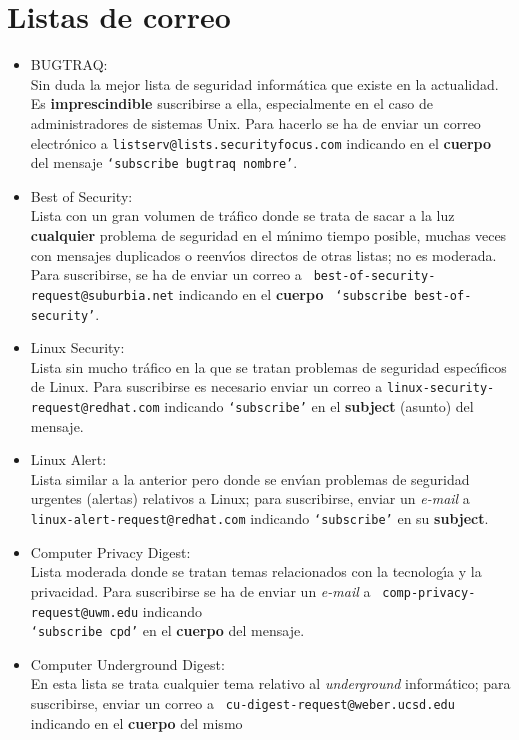 \section{Listas de correo}
\begin{itemize}
\item BUGTRAQ:\\
Sin duda la mejor lista de seguridad inform\'atica que existe en la actualidad.
Es {\bf imprescindible} suscribirse a ella, especialmente en el caso de 
administradores de sistemas Unix. Para hacerlo se ha de enviar un correo 
electr\'onico a {\tt listserv@lists.securityfocus.com} indicando en el {\bf 
cuerpo} del mensaje {\tt `subscribe bugtraq nombre'}.
\item Best of Security:\\
Lista con un gran volumen de tr\'afico donde se trata de sacar a la luz {\bf
cualquier} problema de seguridad en el m\'{\i}nimo tiempo posible, muchas
veces con mensajes duplicados o reenv\'{\i}os directos de otras listas; no
es moderada. Para suscribirse, se ha de enviar un correo a {\tt 
best-of-security-request@suburbia.net} indicando en el {\bf cuerpo} {\tt 
`subscribe best-of-security'}.
\item Linux Security:\\
Lista sin mucho tr\'afico en la que se tratan problemas de seguridad 
espec\'{\i}ficos de Linux. Para suscribirse es necesario enviar un correo a
{\tt linux-security-request@redhat.com} indicando {\tt `subscribe'} en el
{\bf subject} (asunto) del mensaje.
\item Linux Alert:\\
Lista similar a la anterior pero donde se env\'{\i}an problemas de seguridad
urgentes (alertas) relativos a Linux; para suscribirse, enviar un {\it e-mail}
a {\tt linux-alert-request@redhat.com} indicando {\tt `subscribe'} en su
{\bf subject}.
\item Computer Privacy Digest:\\
Lista moderada donde se tratan temas relacionados con la tecnolog\'{\i}a y la
privacidad. Para suscribirse se ha de enviar un {\it e-mail} a {\tt 
comp-privacy-request@uwm.edu} indicando {\tt \\
`subscribe cpd'} en el {\bf cuerpo} del mensaje.
\item Computer Underground Digest:\\
En esta lista se trata cualquier tema relativo al {\it underground} 
inform\'atico; para suscribirse, enviar un correo a {\tt 
cu-digest-request@weber.ucsd.edu} indicando en el {\bf cuerpo} del mismo

\end{itemize}
